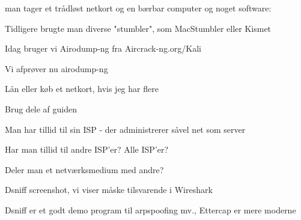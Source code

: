\documentclass[20pt,landscape,a4paper,footrule]{foils}
\begin{document}


\begin{list1}
\item man tager et trådløst netkort og en bærbar computer og noget software:
\begin{list2}
\item Tidligere brugte man diverse "stumbler", som MacStumbler eller Kismet
\item Idag bruger vi Airodump-ng fra Aircrack-ng.org/Kali
  \end{list2}
\end{list1}



\begin{list1}
\item Vi afprøver nu airodump-ng
\item Lån eller køb et netkort, hvis jeg har flere
\item Brug dele af guiden\\ 
\end{list1}





\begin{list1}
\item Man har tillid til sin ISP - der administrerer såvel net som server
\end{list1}


\begin{list1}
\item Har man tillid til andre ISP'er? Alle ISP'er?
\item Deler man et netværksmedium med andre?
\end{list1}





\centerline{Dsniff screenshot, vi viser måske tilsvarende i Wireshark}

Dsniff er et godt demo program til arpspoofing mv., Ettercap er mere moderne
\end{document}
